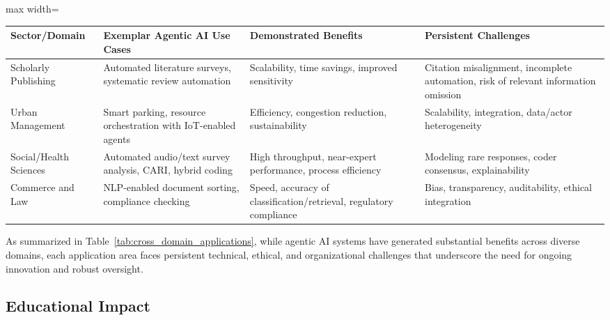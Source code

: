 \begin{table*}[htbp]
\centering
\caption{Representative Cross-Sector Agentic AI Applications and Key Challenges}
\label{tab:cross_domain_applications}
\begin{adjustbox}{max width=\textwidth}
\begin{tabular}{@{}llll@{}}
\toprule
\textbf{Sector/Domain} & \textbf{Exemplar Agentic AI Use Cases} & \textbf{Demonstrated Benefits} & \textbf{Persistent Challenges} \\
\midrule
Scholarly Publishing & Automated literature surveys, systematic review automation & Scalability, time savings, improved sensitivity & Citation misalignment, incomplete automation, risk of relevant information omission \\
Urban Management & Smart parking, resource orchestration with IoT-enabled agents & Efficiency, congestion reduction, sustainability & Scalability, integration, data/actor heterogeneity \\
Social/Health Sciences & Automated audio/text survey analysis, CARI, hybrid coding & High throughput, near-expert performance, process efficiency & Modeling rare responses, coder consensus, explainability \\
Commerce and Law & NLP-enabled document sorting, compliance checking & Speed, accuracy of classification/retrieval, regulatory compliance & Bias, transparency, auditability, ethical integration \\
\bottomrule
\end{tabular}
\end{adjustbox}
\end{table*}

As summarized in Table~\ref{tab:cross_domain_applications}, while agentic AI systems have generated substantial benefits across diverse domains, each application area faces persistent technical, ethical, and organizational challenges that underscore the need for ongoing innovation and robust oversight.

\subsection{Educational Impact}


